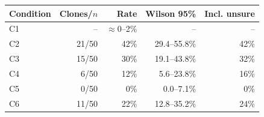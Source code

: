 \begin{tabular}{lrrrr}
\toprule
Condition & Clones/$n$ & Rate & Wilson 95\% & Incl. unsure \\
\midrule
C1 & -- & $\approx$0--2\% & -- & -- \\
C2 & 21/50 & 42\% & 29.4--55.8\% & 42\% \\
C3 & 15/50 & 30\% & 19.1--43.8\% & 32\% \\
C4 & 6/50 & 12\% & 5.6--23.8\% & 16\% \\
C5 & 0/50 & 0\% & 0.0--7.1\% & 0\% \\
C6 & 11/50 & 22\% & 12.8--35.2\% & 24\% \\
\bottomrule
\end{tabular}
